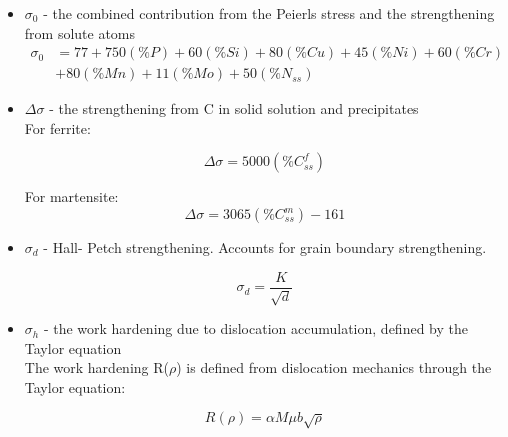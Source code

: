 \documentclass{article}
\begin{document}
\begin{itemize}
    \item $\sigma_0$ - the combined contribution from the Peierls stress and the strengthening from solute atoms
        \begin{equation}
        \label{PeierlsStress}
        \begin{split}
          \sigma_0 &= 77+750(\%P) + 60(\%Si) + 80(\%Cu) + 45(\%Ni) + 60(\%Cr)\\
                & + 80(\%Mn) + 11(\%Mo) + 50(\%N_{ss})
          \end{split}
        \end{equation}
  
    \item $\Delta\sigma$ - the strengthening from C in solid solution and precipitates\\
    
            For ferrite:
            
            \begin{equation}
            \label{solidsolM}
                 \Delta\sigma=5000(\%C_{ss}^f)  
            \end{equation}
    
    
    
        For martensite:
        \begin{equation}
        \label{solidsolM}
            \Delta\sigma=3065(\%C_{ss}^m)-161
        \end{equation}
    
    

    \item $\sigma_d$ - Hall- Petch strengthening. Accounts for grain boundary strengthening.
    
    \begin{equation}
        \sigma_d = \frac{K}{\sqrt{d}}
    \end{equation}
    
    \item $\sigma_h$ - the work hardening due to dislocation accumulation, defined by the Taylor equation\\
    
    The work hardening R($\rho$) is defined from dislocation mechanics through the Taylor equation:
    
    \begin{equation}
    \label{Eq:Tayloreq}
        R(\rho)=\alpha M \mu b \sqrt{\rho}
    \end{equation}
    

\end{itemize}
\end{document}
